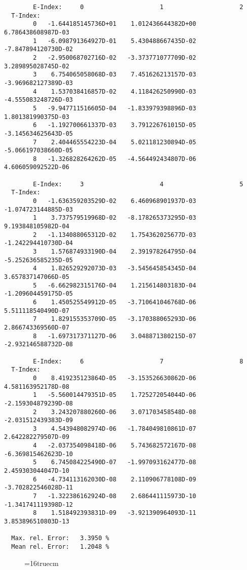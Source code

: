 \documentclass[12pt,dvipdfmx]{article}
\begin{document}
\begin{small}\begin{verbatim}
        E-Index:     0                     1                     2
  T-Index:
        0   -1.644185145736D+01    1.012436644382D+00    6.786438608987D-03
        1   -6.098791364927D-01    5.430488667435D-02   -7.847894120730D-02
        2   -2.950068702716D-02   -3.373771077709D-02    3.289895028745D-02
        3    6.754065058068D-03    7.451626213157D-03   -3.969682127389D-03
        4    1.537038416857D-02    4.118426250990D-03   -4.555083248726D-03
        5   -9.947711516605D-04   -1.833979398896D-03    1.801381990375D-03
        6   -1.192700661337D-03    3.791226761015D-05   -3.145634625643D-05
        7    2.404465554223D-04    5.021181230894D-05   -5.066197038660D-05
        8   -1.326828264262D-05   -4.564492434807D-06    4.606059092522D-06

        E-Index:     3                     4                     5
  T-Index:
        0   -1.636359203529D-02    6.460968901937D-03   -1.074723144885D-03
        1    3.737579519968D-02   -8.178265373295D-03    9.193848105982D-04
        2   -1.134088065312D-02    1.754362025677D-03   -1.242294410730D-04
        3    1.576874933190D-04    2.391978264795D-04   -5.252636585235D-05
        4    1.826529292073D-03   -3.545645854345D-04    3.657837147066D-05
        5   -6.662982315176D-04    1.215614803183D-04   -1.209604459175D-05
        6    1.450525549912D-05   -3.710641046768D-06    5.511118540490D-07
        7    1.829155353709D-05   -3.170388065293D-06    2.866743369560D-07
        8   -1.697317371127D-06    3.048871380215D-07   -2.932146588732D-08

        E-Index:     6                     7                     8
  T-Index:
        0    8.419235123864D-05   -3.153526630862D-06    4.581163952178D-08
        1   -5.560014479351D-05    1.725272054044D-06   -2.159304879239D-08
        2    3.243207880260D-06    3.071703458548D-08   -2.031512439383D-09
        3    4.543948082974D-06   -1.784049810861D-07    2.642282279507D-09
        4   -2.037354098418D-06    5.743682572167D-08   -6.369815462623D-10
        5    6.745084225490D-07   -1.997093162477D-08    2.459303044047D-10
        6   -4.734113162030D-08    2.110906778108D-09   -3.702822546028D-11
        7   -1.322386162924D-08    2.686441115973D-10   -1.341741119398D-12
        8    1.518492393831D-09   -3.921390964093D-11    3.853896510803D-13

  Max. rel. Error:   3.3950 %
  Mean rel. Error:   1.2048 %

\end{verbatim}\end{small}
\begin{figure} \label{2.2.14d}
\epsfxsize=16truecm
\end{figure}
\newpage
\end{document}
